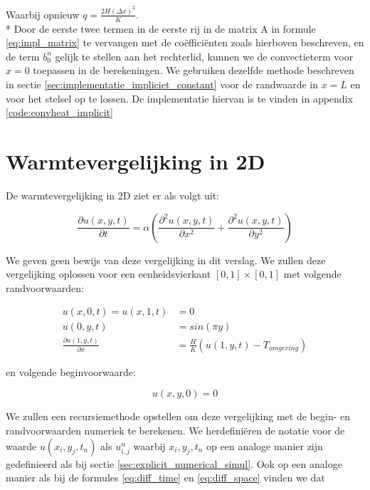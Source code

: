 \documentclass[a4paper,kulak]{kulakarticle} %
\begin{document}
Waarbij opnieuw $q = \frac{2 H (\Delta x)^2}{K}$.\\*
Door de eerste twee termen in de eerste rij in de matrix A in formule \ref{eq:impl_matrix} te vervangen met de coëfficiënten zoals hierboven beschreven, en de term $b_0^n$ gelijk te stellen aan het rechterlid, kunnen we de convectieterm voor $x=0$ toepassen in de berekeningen. We gebruiken dezelfde methode beschreven in sectie \ref{sec:implementatie_impliciet_constant} voor de randwaarde in $x = L$ en voor het stelsel op te lossen. De implementatie hiervan is te vinden in appendix \ref{code:convheat_implicit}

\section{Warmtevergelijking in 2D}



De warmtevergelijking in 2D ziet er als volgt uit:

\begin{equation}
	\frac{\partial u(x, y, t)}{\partial t} = \alpha \left( \frac{\partial^2u(x, y, t)}{\partial x^2}
	+ \frac{\partial^2u(x, y, t)}{\partial y^2}
	\right)
	\label{eq:2D_heat}
\end{equation}

We geven geen bewijs van deze vergelijking in dit verslag. We zullen deze vergelijking oplossen voor een eenheidsvierkant $[0, 1] \times [0, 1]$ met volgende randvoorwaarden:

\begin{align}
	u(x, 0, t) = u(x, 1, t) &= 0 
	\label{eq:2D_border_y}\\
	u(0, y, t) &= sin(\pi y) 
	\label{eq:2D_border_x_0}\\
	\frac{\partial u(1, y, t)}{\partial x} &= \frac{H}{K} \left(u(1, y, t) - T_{omgeving}\right)
	\label{eq:2D_border_x_1}
\end{align}

en volgende beginvoorwaarde:

\begin{equation}
	u(x, y, 0) = 0
	\label{eq:2D_init}
\end{equation}

We zullen een recursiemethode opstellen om deze vergelijking met de begin- en randvoorwaarden numeriek te berekenen. We herdefiniëren de notatie voor de waarde $u(x_i, y_j, t_n)$ als $u_{i, j}^n$ waarbij $x_i, y_j, t_n$ op een analoge manier zijn gedefinieerd als bij sectie \ref{sec:explicit_numerical_simul}. Ook op een analoge manier als bij de formules \ref{eq:diff_time} en \ref{eq:diff_space} vinden we dat
\end{document}
